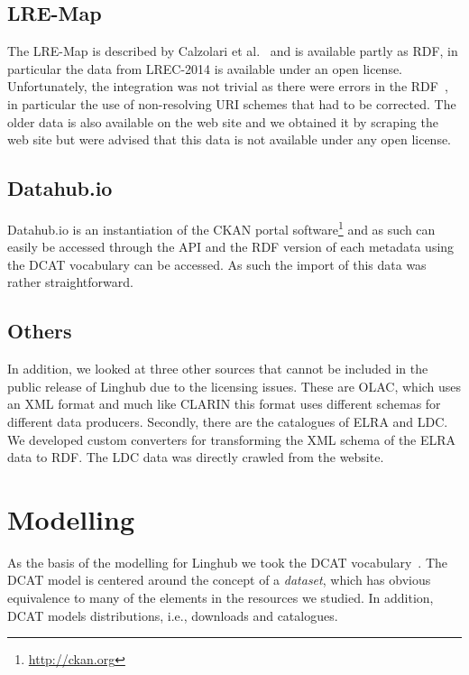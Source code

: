 \documentclass[smallextended]{svjour3}       %
\begin{document}
\subsection{LRE-Map}

The LRE-Map is described by Calzolari et al.~\cite{calzolari2012lre} and is available partly as RDF, in
particular the data from LREC-2014 is available under an open license. Unfortunately, the integration
was not trivial as there were errors in the RDF~\cite{del2014lre}, in particular the use of
non-resolving URI schemes that had to be corrected. The older data is also
available on the web site and we obtained it by scraping the web site but were
advised that this data is not available under any open license.

\subsection{Datahub.io}

Datahub.io is an instantiation of the CKAN portal
software\footnote{\url{http://ckan.org}} and as such can
easily be accessed through the API and the RDF version of each metadata using
the DCAT vocabulary can be accessed. As such the import of this data was
rather straightforward.

\subsection{Others}

In addition, we looked at three other sources that cannot be included in the
public release of Linghub due to the licensing issues. These are OLAC, which
uses an XML format and much like CLARIN this format uses different schemas for
different data producers. Secondly, there are the catalogues of ELRA and LDC\@.
We developed custom converters for transforming the XML schema of the ELRA data
to RDF\@. The LDC data was directly crawled from the website. 

\section{Modelling}
\label{modelling}

As the basis of the modelling for Linghub we took the DCAT
vocabulary~\cite{maali2014data}. The DCAT model is centered around the concept
of a \emph{dataset}, which has obvious equivalence to many of the elements in
the resources we studied. In addition, DCAT models distributions, i.e.,
downloads and catalogues. 
\end{document}
